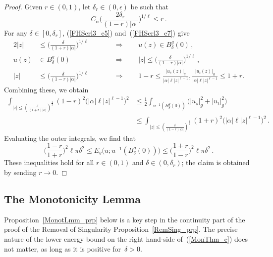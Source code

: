\documentclass[11pt]{article}
\numberwithin{equation}{section}
\theoremstyle{definition}
\def\BE#1{\begin{equation}\label{#1}}
\def\EE{\end{equation}}
\def\eref#1{(\ref{#1})}
\def\sf#1{\textsf{#1}}
\def\lra{\longrightarrow}
\def\Lra{\Longrightarrow}
\def\al{\alpha}
\def\de{\delta}
\def\ep{\epsilon}
\begin{document}
\begin{proof}
\noindent
Given $r\!\in\!(0,1)$, let $\de_r\!\in\!(0,\ep)$ be such that 
\BE{FHScrl3_e7}
C_{\al}\bigg(\frac{2\de_r}{(1\!-\!r)|\al|}\bigg)^{1/\ell}\le r\,.\EE
For any $\de\!\in\![0,\de_r]$, \eref{FHScrl3_e5} and~\eref{FHScrl3_e7} give
\begin{alignat*}{2}  
|z|&\le \bigg(\frac{\de}{(1\!+\!r)|\al|}\bigg)^{1/\ell} &\qquad&\Lra\qquad
u(z)\in B_{\de}^g(0)\,,\\
u(z)&\in B_{\de}^g(0) &\qquad&\Lra\qquad 
|z|\le \bigg(\frac{\de}{(1\!-\!r)|\al|}\bigg)^{1/\ell}\,,\\
|z|&\le \bigg(\frac{\de}{(1\!-\!r)|\al|}\bigg)^{1/\ell} &\qquad&\Lra\qquad
1\!-\!r \le \frac{|u_s(z)|_g}{|\al|\ell|z|^{\ell-1}},\frac{|u_t(z)|_g}{|\al|\ell|z|^{\ell-1}}
\le 1\!+\!r.
\end{alignat*}  
Combining these, we obtain
\begin{equation*}\begin{split}
\int_{|z|\le\left(\frac{\de}{(1+r)|\al|}\right)^{\!\!\frac1\ell}}
(1\!-\!r)^2\big(|\al|\ell|z|^{\ell-1}\big)^2    
&\le \frac12\int_{u^{-1}(B_{\de}^g(0))}\!\!\big(|u_s|_g^2\!+\!|u_t|_g^2\big)\\
&\le \int_{|z|\le\left(\frac{\de}{(1-r)|\al|}\right)^{\!\!\frac1\ell}}
(1\!+\!r)^2\big(|\al|\ell|z|^{\ell-1}\big)^2  \,.
\end{split}\end{equation*}
Evaluating the outer integrals, we find that 
$$\bigg(\frac{1\!-\!r}{1\!+\!r}\bigg)^{\!2}\ell\pi\de^2
\le E_g\big(u;u^{-1}(B_{\de}^g(0))\big)
\le \bigg(\frac{1\!+\!r}{1\!-\!r}\bigg)^{\!2}\ell\pi\de^2\,.$$
These inequalities hold for all $r\!\in\!(0,1)$ and $\de\!\in\!(0,\de_r)$;
the claim is obtained by sending $r\!\lra\!0$.
\end{proof}



\subsection{The Monotonicity Lemma}
\label{MonotLmm_subs}

\noindent
Proposition~\ref{MonotLmm_prp} below is a key step in the continuity part 
of the proof of the \sf{Removal of Singularity} Proposition~\ref{RemSing_prp}.
The precise nature of the lower energy bound on the right hand-side of~\eref{MonThm_e} 
does not matter, as long as it is positive for~$\de\!>\!0$.
\end{document}
